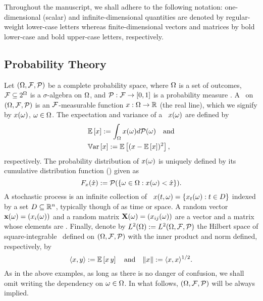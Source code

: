 Throughout the manuscript, we shall adhere to the following notation: one-dimensional (scalar) and infinite-dimensional quantities are denoted by regular-weight lower-case letters whereas finite-dimensional vectors and matrices by bold lower-case and bold upper-case letters, respectively.

\subsection{Probability Theory}
Let $(\Omega, \mathcal{F}, \mathcal{P})$ be a complete probability space, where $\Omega$ is a set of outcomes, $\mathcal{F} \subseteq 2^\Omega$ is a $\sigma$-algebra on $\Omega$, and $\mathcal{P}: \mathcal{F} \to [0, 1]$ is a probability measure \cite{maitre2010}.
A \rv\ on $(\Omega, \mathcal{F}, \mathcal{P})$ is an $\mathcal{F}$-measurable function $x: \Omega \to \mathbb{R}$ (the real line), which we signify by $x(\omega)$, $\omega \in \Omega$.
The expectation and variance of a \rv\ $x(\omega)$ are defined by
\begin{align*}
  & \mathbb{E}\left[ x \right] := \int_\Omega x(\omega) d \mathcal{P}(\omega) \hspace{1em} \text{and} \\
  & \mathbb{V}\text{ar}\left[ x \right] := \mathbb{E}\left[ (x - \mathbb{E}\left[ x \right])^2 \right],
\end{align*}
respectively.
The probability distribution of $x(\omega)$ is uniquely defined by its cumulative distribution function (\cdf) given as
\begin{equation*}
  F_x(\hat{x}) := \mathcal{P}(\{ \omega \in \Omega: x(\omega) < \hat{x} \}).
\end{equation*}
A stochastic process is an infinite collection of \rvs\ $x(t, \omega) = \{ x_t(\omega): t \in D \}$ indexed by a set $D \subseteq \mathbb{R}^n$, typically though of as time or space.
A random vector $\mathbf{x}(\omega) = (x_i(\omega))$ and a random matrix $\mathbf{X}(\omega) = (x_{ij}(\omega))$ are a vector and a matrix whose elements are \rvs.
Finally, denote by $L^{2}(\Omega) := L^{2}(\Omega, \mathcal{F}, \mathcal{P})$ the Hilbert space of square-integrable \rvs\ defined on $(\Omega, \mathcal{F}, \mathcal{P})$ with the inner product and norm defined, respectively, by
\begin{equation*}
  \langle x, y \rangle := \mathbb{E}\left[ x \, y \right] \hspace{1em} \text{and} \hspace{1em} \| x \| := \langle x, x \rangle^{1/2}.
\end{equation*}
As in the above examples, as long as there is no danger of confusion, we shall omit writing the dependency on $\omega \in \Omega$.
In what follows, $(\Omega, \mathcal{F}, \mathcal{P})$ will be always implied.

